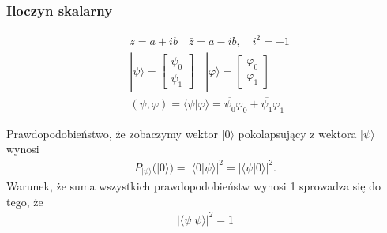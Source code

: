 \documentclass[10pt,t]{beamer}
\begin{document}
\begin{frame}
  \frametitle{Iloczyn skalarny}


  \begin{align*}
    &z = a + ib \quad \bar{z} = a - ib, \quad i^{ 2 } = -1 \\
    &| \psi \rangle
      =
      \begin{bmatrix}
        \psi_{ 0 } \\
        \psi_{ 1 }
      \end{bmatrix}
    \quad
    | \varphi \rangle
    =
    \begin{bmatrix}
      \varphi_{ 0 } \\
      \varphi_{ 1 }
    \end{bmatrix} \\
    &( \psi, \varphi ) = \langle \psi | \varphi \rangle
      =
      \overline{ \psi_{ 0 } } \varphi_{ 0 } + \overline{ \psi_{ 1 } } \varphi_{ 1 }
  \end{align*}

  Prawdopodobieństwo, że zobaczymy wektor $| 0 \rangle$ pokolapsujący z wektora
  $| \psi \rangle$ wynosi
  \begin{align*}
    P_{ | \psi \rangle }( | 0 \rangle ) = | \langle 0 | \psi \rangle |^{ 2 } = | \langle \psi | 0 \rangle |^{ 2 }.
  \end{align*}
  Warunek, że suma wszystkich prawdopodobieństw wynosi 1 sprowadza się do
  tego, że
  \begin{align*}
    | \langle \psi | \psi \rangle |^{ 2 } = 1
  \end{align*}

\end{frame}
\end{document}
